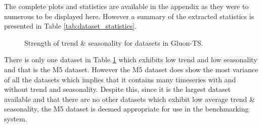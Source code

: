 The complete plots and statistics are available in the appendix as they were to numerous to be displayed here. However a summary of the extracted statistics is presented in Table \ref{tab:dataset_statistics}.


\begin{figure}[h]
    \centering
    \caption{Strength of trend \& seasonality for datasets in Gluon-TS.}
    \label{heatmap_strengths}
\end{figure}
There is only one dataset in Table \ref{heatmap_strengths} which exhibits low trend and low seasonality and that is the M5 dataset. However the M5 dataset does show the most variance of all the datasets which implies that it contains many timeseries with and without trend and seasonality. Despite this, since it is the largest dataset available and that there are no other datasets which exhibit low average trend \& seasonality, the M5 dataset is deemed appropriate for use in the benchmarking system.

